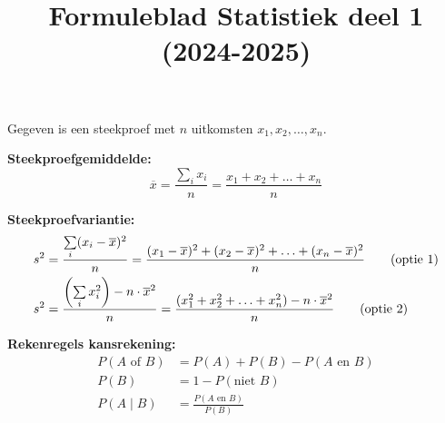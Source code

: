 \documentclass[11pt,a4paper,dutch]{article} %
\title{Formuleblad Statistiek deel 1 (2024-2025)}
\author{}
\date{}
\begin{document}
\maketitle

Gegeven is een steekproef met $n$ uitkomsten $x_1, x_2, \ldots, x_n$.

\textbf{Steekproefgemiddelde:}
\[
    \overline{x} = \frac{\sum\limits_{i} x_i}{n} = \frac{x_1 + x_2 + \ldots + x_n}{n}
\]

\textbf{Steekproefvariantie:}
\begin{align}
    s^2 &= \frac{\sum\limits_{i} (x_i-\overline{x})^2}{n} = \frac{(x_1-\overline{x})^2 + (x_2-\overline{x})^2 + \ldots + (x_n - \overline{x})^2}{n} \hfill \tag{optie 1} \\%
    s^2 &= \frac{\left(\sum\limits_{i} x_i^2\right) - n \cdot \overline{x}^2}{n} = \frac{(x_1^2+x_2^2+\ldots+x_n^2) - n \cdot \overline{x}^2}{n} \hfill \tag{optie 2}
\end{align}
\vspace{.5cm}

\textbf{Rekenregels kansrekening:}
\begin{align*}
    P(A \text{ of } B)      &= P(A) + P(B) - P(A \text{ en } B) \tag{optelregel}\\
    P(B)                    &= 1 - P(\text{niet } B) \tag{complementregel}\\
    P(A \mid B)         &= \frac{P(A \text{ en } B)}{P(B)} \tag{conditionele kansen}\\
\end{align*}
\end{document}
